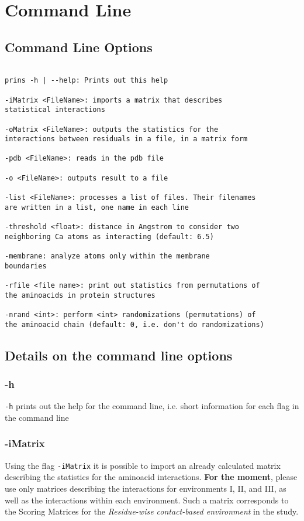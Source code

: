 \chapter*{Command Line}

\section*{Command Line Options}

\begin{verbatim}

prins -h | --help: Prints out this help

-iMatrix <FileName>: imports a matrix that describes
statistical interactions

-oMatrix <FileName>: outputs the statistics for the
interactions between residuals in a file, in a matrix form

-pdb <FileName>: reads in the pdb file

-o <FileName>: outputs result to a file

-list <FileName>: processes a list of files. Their filenames
are written in a list, one name in each line

-threshold <float>: distance in Angstrom to consider two
neighboring Ca atoms as interacting (default: 6.5)

-membrane: analyze atoms only within the membrane
boundaries

-rfile <file name>: print out statistics from permutations of 
the aminoacids in protein structures

-nrand <int>: perform <int> randomizations (permutations) of 
the aminoacid chain (default: 0, i.e. don't do randomizations)

\end{verbatim}


\section*{Details on the command line options}

\subsection*{-h}
\verb!-h! prints out the help for the command line, i.e. short information for each flag in the command line

\subsection*{-iMatrix}
Using the flag \verb!-iMatrix! it is possible to import an already calculated matrix describing the statistics for the aminoacid interactions. {\bf For the moment}, please use only matrices describing the interactions for environments I, II, and III, as well as the interactions within each environment. Such a matrix corresponds to the Scoring Matrices for the {\it Residue-wise contact-based environment} in the \cite{Jha2011} study. 

